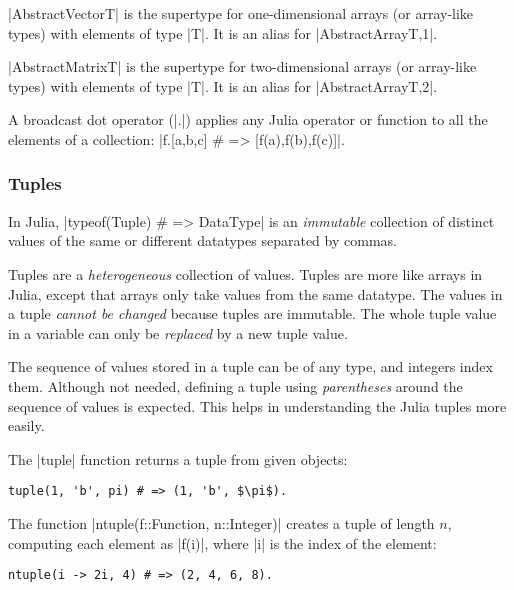 |AbstractVector{T}| is the supertype for one-dimensional arrays (or array-like types) with elements of type |T|. It is an alias for |AbstractArray{T,1}|. 

|AbstractMatrix{T}| is the supertype for two-dimensional arrays (or array-like types) with elements of type |T|. It is an alias for |AbstractArray{T,2}|.

A broadcast dot operator (|.|) applies any Julia operator or function to all the elements of a collection: |f.[a,b,c] # => [f(a),f(b),f(c)]|. 




\subsubsection*{Tuples}

In Julia, |typeof(Tuple) # => DataType| is an \emph{immutable} collection of distinct values of the same or different datatypes separated by commas. 

Tuples are a \emph{heterogeneous} collection of values. Tuples are more like arrays in Julia, except that arrays only take values from the same datatype. 
The values in a tuple \emph{cannot be changed} because tuples are immutable. The whole  tuple value in a variable can only be \emph{replaced} by a new tuple value.

The sequence of values stored in a tuple can be of any type, and integers index them. Although not needed, defining a tuple using \emph{parentheses} around the sequence of values is expected. This helps in understanding the Julia tuples more easily.

\begin{coding}
The |tuple| function returns a tuple from given objects: 
\begin{lstlisting}[language=JuliaLocal, style=julia, mathescape=true]
  tuple(1, 'b', pi) # => (1, 'b', $\pi$). 
\end{lstlisting}
\end{coding}

\begin{coding}
The function |ntuple(f::Function, n::Integer)| creates a tuple of length $n$, computing each element as |f(i)|, where |i| is the index of the element: 
\begin{lstlisting}[language=JuliaLocal, style=julia, mathescape=false]
  ntuple(i -> 2i, 4) # => (2, 4, 6, 8).
\end{lstlisting}
\end{coding}


